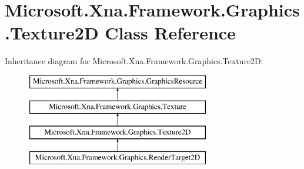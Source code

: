 \hypertarget{class_microsoft_1_1_xna_1_1_framework_1_1_graphics_1_1_texture2_d}{}\section{Microsoft.\+Xna.\+Framework.\+Graphics.\+Texture2\+D Class Reference}
\label{class_microsoft_1_1_xna_1_1_framework_1_1_graphics_1_1_texture2_d}
Inheritance diagram for Microsoft.\+Xna.\+Framework.\+Graphics.\+Texture2\+D\+:\begin{figure}[H]
\begin{center}
\leavevmode
\includegraphics[height=4.000000cm]{class_microsoft_1_1_xna_1_1_framework_1_1_graphics_1_1_texture2_d}
\end{center}
\end{figure}
